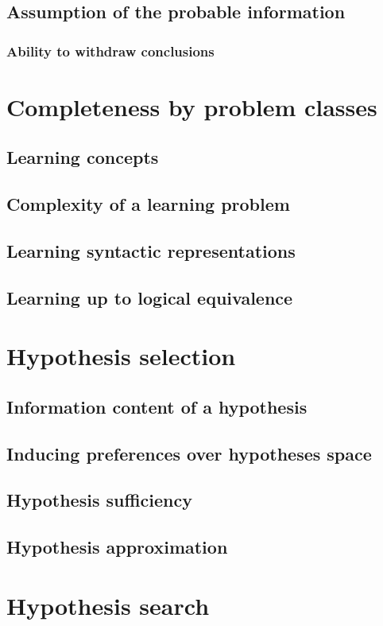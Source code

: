\subsection{Assumption of the probable information}

\subsubsection{Ability to withdraw conclusions}


\section{Completeness by problem classes}
\subsection{Learning concepts}
\subsection{Complexity of a learning problem}
\subsection{Learning syntactic representations}
\subsection{Learning up to logical equivalence}
\section{Hypothesis selection}
\subsection{Information content of a hypothesis}
\subsection{Inducing preferences over hypotheses space}
\subsection{Hypothesis sufficiency}
\subsection{Hypothesis approximation}
\section{Hypothesis search}
